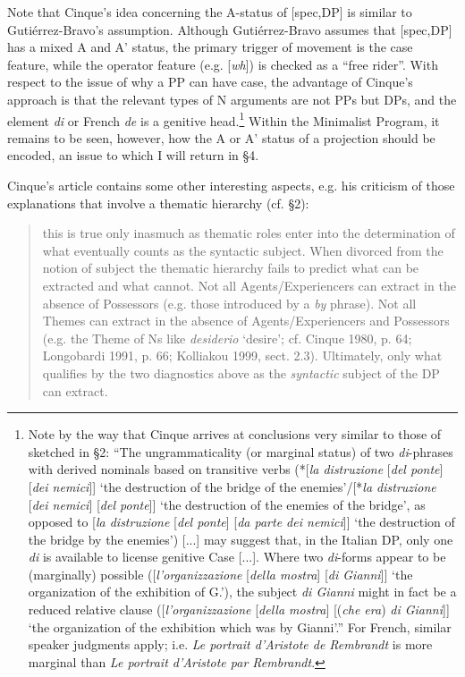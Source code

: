 \documentclass[output=paper]{langsci/langscibook}
\begin{document}
Note that Cinque’s idea concerning the A-status of [spec,DP] is similar to Gutiérrez-Bravo’s assumption. Although Gutiérrez-Bravo assumes that [spec,DP] has a mixed A and A’ status, the primary trigger of movement is the case feature, while the operator feature (e.g. [\textit{wh}]) is checked as a “free rider”. With respect to the issue of why a PP can have case, the advantage of Cinque’s approach is that the relevant types of N arguments are not PPs but DPs, and the element \textit{di} or French \textit{de} is a genitive head.\footnote{Note by the way that Cinque arrives at conclusions very similar to those of \citet{Kolliakou1999} sketched in §2: “The ungrammaticality (or marginal status) of two \textit{di}{}-phrases with derived nominals based on transitive verbs (*[\textit{la distruzione} [\textit{del ponte}] [\textit{dei nemici}]] ‘the destruction of the bridge of the enemies’/[*\textit{la distruzione} [\textit{dei nemici}] [\textit{del ponte}]] ‘the destruction of the enemies of the bridge’, as opposed to [\textit{la distruzione} [\textit{del ponte}] [\textit{da parte dei nemici}]] ‘the destruction of the bridge by the enemies’) [...] may suggest that, in the Italian DP, only one \textit{di} is available to license genitive Case [...]. Where two \textit{di}-forms appear to be (marginally) possible ([\textit{l’organizzazione} [\textit{della mostra}] [\textit{di Gianni}]] ‘the organization of the exhibition of G.’), the subject \textit{di Gianni} might in fact be a reduced relative clause ([\textit{l’organizzazione} [\textit{della mostra}] [(\textit{che era}) \textit{di Gianni}]] ‘the organization of the exhibition which was by Gianni’.” For French, similar speaker judgments apply; i.e. \textit{Le portrait d’Aristote de Rembrandt} is more marginal than \textit{Le portrait d’Aristote par Rembrandt}.} Within the Minimalist Program, it remains to be seen, however, how the A or A’ status of a projection should be encoded, an issue to which I will return in §4.

Cinque’s article contains some other interesting aspects, e.g. his criticism of those explanations that involve a thematic hierarchy (cf. §2):

\begin{quote}\relax [...] this is true only inasmuch as thematic roles enter into the determination of what eventually counts as the syntactic subject. When divorced from the notion of subject the thematic hierarchy fails to predict what can be extracted and what cannot. Not all Agents/Experiencers can extract in the absence of Possessors (e.g. those introduced by a \textit{by} phrase). Not all Themes can extract in the absence of Agents/Experiencers and Possessors (e.g. the Theme of Ns like \textit{desiderio} ‘desire’; cf. Cinque 1980, p. 64; Longobardi 1991, p. 66; Kolliakou 1999, sect. 2.3). Ultimately, only what qualifies by the two diagnostics above as the \textit{syntactic} subject of the DP can extract.\\\hbox{}\hfill{\citep[95–96, Footnote 1]{Cinque2014}}\end{quote}
\end{document}
